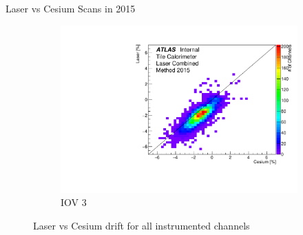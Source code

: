 \documentclass{beamer}
\begin{document}
\begin{frame}{Laser vs Cesium Scans in 2015}
\begin{figure}[H]
\begin{subfigure} [t] {0.3\textwidth}
\includegraphics[width=\textwidth]{colz_iov3.pdf}
\caption{IOV 3}
\end{subfigure}
\caption{Laser vs Cesium drift for all instrumented channels}
\end{figure}
\end{frame}
\end{document}
